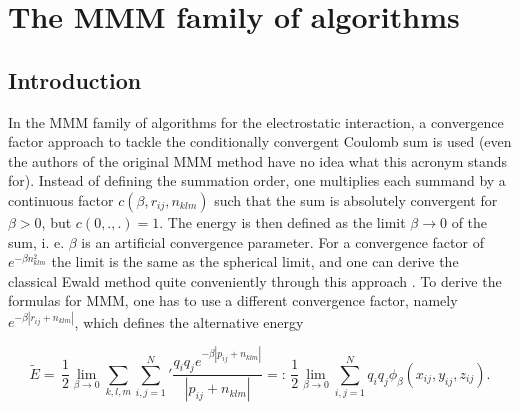 %  
%   
%  
%  
%
\chapter{The MMM family of algorithms}
\label{chap:mmm}

\section{Introduction}

 In the MMM family of
algorithms for the electrostatic interaction, a convergence factor
approach to tackle the conditionally convergent Coulomb sum is used
(even the authors of the original MMM method have no idea what this
acronym stands for). Instead of defining the summation order, one
multiplies each summand by a continuous factor
$c(\beta,r_{ij},n_{klm})$ such that the sum is absolutely convergent
for $\beta>0$, but $c(0,.,.)=1$. The energy is then defined as the
limit $\beta\rightarrow 0$ of the sum, i. e. $\beta$ is an artificial
convergence parameter. For a convergence factor of $e^{-\beta
  n_{klm}^2}$ the limit is the same as the spherical limit, and one
can derive the classical Ewald method quite conveniently through this
approach \citep{smith81a}. To derive the formulas for MMM, one has to
use a different convergence factor, namely
$e^{-\beta|r_{ij}+n_{klm}|}$, which defines the alternative energy

\[ \tilde{E}=\,\frac{1}{2}\lim_{\beta\rightarrow
  0}\sum_{k,l,m}{\sum_{i,j=1}^N}' \frac{q_i q_je^{-\beta|p_{ij} +
    n_{klm}|}} {|p_{ij} + n_{klm}|}
=:\,\frac{1}{2}\lim_{\beta\rightarrow 0}\sum_{i,j=1}^N
q_iq_j\phi_\beta(x_{ij}, y_{ij},z_{ij}). \]

